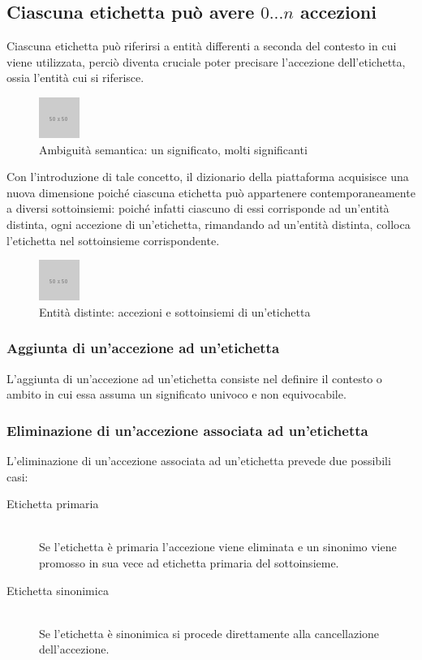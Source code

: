 \documentclass[10pt,a4paper,headinclude,footinclude,hidelinks]{scrreprt} %
\begin{document}
	\subsection[Accezioni]{Ciascuna etichetta può avere $0...n$ accezioni}
	Ciascuna etichetta può riferirsi a entità differenti a seconda del contesto in cui viene utilizzata, perciò diventa cruciale poter precisare l'accezione dell'etichetta, ossia l'entità cui si riferisce.
	\begin{figure}[ht]
		\begin{center}
	    	\includegraphics{../placeholder.png}
			\caption[Ambiguità semantica]{Ambiguità semantica: un significato, molti significanti}
		\end{center}
	\end{figure}
	
	Con l'introduzione di tale concetto, il dizionario della piattaforma acquisisce una nuova dimensione poiché ciascuna etichetta può appartenere contemporaneamente a diversi sottoinsiemi: poiché infatti ciascuno di essi corrisponde ad un'entità distinta, ogni accezione di un'etichetta, rimandando ad un'entità distinta, colloca l'etichetta nel sottoinsieme corrispondente.
	\begin{figure}[ht]
		\begin{center}
	    	\includegraphics{../placeholder.png}
			\caption[Accezioni e sottoinsiemi]{Entità distinte: accezioni e sottoinsiemi di un'etichetta}
		\end{center}
	\end{figure}

	\subsubsection{Aggiunta di un'accezione ad un'etichetta}
	L'aggiunta di un'accezione ad un'etichetta consiste nel definire il contesto o ambito in cui essa assuma un significato univoco e non equivocabile.

	\subsubsection{Eliminazione di un'accezione associata ad un'etichetta}
	L'eliminazione di un'accezione associata ad un'etichetta prevede due possibili casi:
	\begin{description}
	\item[Etichetta primaria] \hfill \\
	Se l'etichetta è primaria l'accezione viene eliminata e un sinonimo viene promosso in sua vece ad etichetta primaria del sottoinsieme.
 	\item[Etichetta sinonimica] \hfill \\
	Se l'etichetta è sinonimica si procede direttamente alla cancellazione dell'accezione.
	\end{description}
\end{document}

